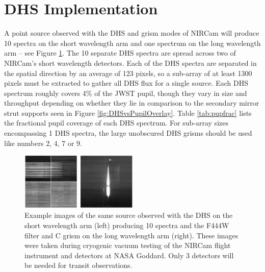 \documentclass{emulateapj}
\begin{document}
\section{DHS Implementation}\label{sec:implementation}

A point source observed with the DHS and grism modes of NIRCam will produce 10 spectra on the short wavelength arm and one spectrum on the long wavelength arm -- see Figure \ref{fig:DHSimage}. The 10 separate DHS spectra are spread across two of NIRCam's short wavelength detectors. Each of the DHS spectra are separated in the spatial direction by an average of 123 pixels, so a sub-array of at least 1300 pixels must be extracted to gather all DHS flux for a single source. Each DHS spectrum roughly covers 4\% of the JWST pupil, though they vary in size and throughput depending on whether they lie in comparison to the secondary mirror strut supports seen in Figure \ref{fig:DHSvsPupilOverlay}. Table \ref{tab:pupfrac} lists the fractional pupil coverage of each DHS spectrum. For sub-array sizes encompassing 1 DHS spectra, the large unobscured DHS grisms should be used like numbers 2, 4, 7 or 9.

\begin{figure}[!ht]
\includegraphics[width=0.5\textwidth]{dhs_image_example.png}
\caption{Example images of the same source observed with the DHS on the short wavelength arm (left) producing 10 spectra and the F444W filter and C grism on the long wavelength arm (right). These images were taken during cryogenic vacuum testing of the NIRCam flight instrument and detectors at NASA Goddard. Only 3 detectors will be needed for transit observations.}\label{fig:DHSimage}
\end{figure}
\end{document}
